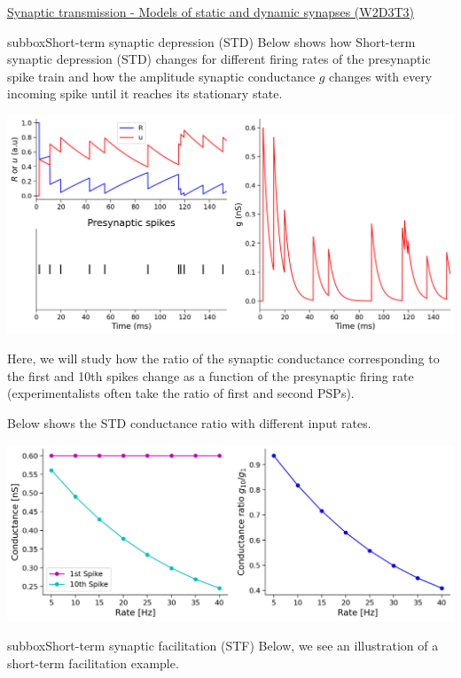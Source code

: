 \begin{textbox}{\href{https://compneuro.neuromatch.io/tutorials/W2D3_BiologicalNeuronModels/student/W2D3_Tutorial3.html}{Synaptic transmission - Models of static and dynamic synapses (W2D3T3)} }
\begin{subbox}{subbox}{Short-term synaptic depression (STD)}
\scriptsize
Below shows how Short-term synaptic depression (STD) changes for different firing rates of the presynaptic spike train and how the amplitude synaptic conductance $g$ changes with every incoming spike until it reaches its stationary state. 
\begin{center}
    
\includegraphics[scale=0.14]{Figures/BNM/LIF_Figure10.png}
\end{center}

Here, we will study how the ratio of the synaptic conductance corresponding to the first and 10th spikes change as a function of the presynaptic firing rate (experimentalists often take the ratio of first and second PSPs).

Below shows the STD conductance ratio with different input rates.
\begin{center}
    
\includegraphics[scale=0.14]{Figures/BNM/LIF_Figure11.png}
\end{center}

\end{subbox}
\begin{subbox}{subbox}{Short-term synaptic facilitation (STF)}
\scriptsize
Below, we see an illustration of a short-term facilitation example. 


\end{subbox}
\end{textbox}
